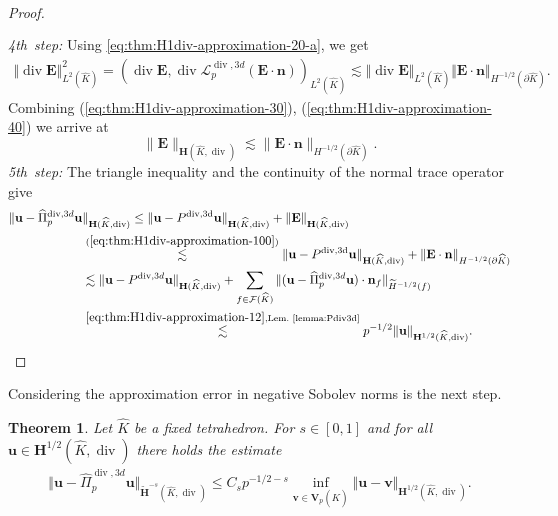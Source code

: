 \documentclass{article}
\newtheorem{theorem}{Theorem}[section]
\newcommand{\hatPidivcom}{\widehat\Pi^{\operatorname*{div},3d}_{p}}
\begin{document}
\begin{proof}
\begin{align}
\begin{split}
\end{split}
\end{align}
\emph{4th~step:} 
Using \eqref{eq:thm:H1div-approximation-20-a}, we get 
\begin{align}
\label{eq:thm:H1div-approximation-40}
\Vert\operatorname*{div}\mathbf{E}\Vert_{L^2(\widehat{K})}^2 = (\operatorname*{div}\mathbf{E},\operatorname*{div}\boldsymbol{\mathcal{L}}^{\operatorname*{div},3d}_p(\mathbf{E}\cdot\mathbf{n}))_{L^2(\widehat{K})} \lesssim \Vert\operatorname*{div}\mathbf{E}\Vert_{L^2(\widehat{K})} \Vert\mathbf{E}\cdot\mathbf{n}\Vert_{H^{-1/2}(\partial\widehat{K})}.
\end{align}
Combining 
(\ref{eq:thm:H1div-approximation-30}),
(\ref{eq:thm:H1div-approximation-40}) 
we arrive at 
\begin{equation}
\label{eq:thm:H1div-approximation-100}
\|{\mathbf E}\|_{{\mathbf H}(\widehat K ,\operatorname{div})} 
\lesssim \|{\mathbf E} \cdot {\mathbf n}\|_{H^{-1/2}(\partial \widehat K)}. 
\end{equation}
\emph{5th~step:} The triangle inequality and the continuity of the normal trace operator give 
\begin{align*}
\Vert \mathbf{u}-\hatPidivcom\mathbf{u}&\Vert_{\mathbf{H}(\widehat{K},\operatorname*{div})} 
\leq \Vert\mathbf{u} - P^{\operatorname{div,3d}}{\mathbf u}\Vert_{\mathbf{H}(\widehat{K},\operatorname*{div})} 
+ \Vert\mathbf{E}\Vert_{\mathbf{H}(\widehat{K},\operatorname*{div})} \\
&\stackrel{(\ref{eq:thm:H1div-approximation-100})}{\lesssim} 
\Vert\mathbf{u} - P^{\operatorname{div,3d}}{\mathbf u}\Vert_{\mathbf{H}(\widehat{K},\operatorname*{div})} 
+ \Vert\mathbf{E}\cdot{\mathbf n}\Vert_{H^{-1/2}(\partial \widehat{K})} \\
&\lesssim \Vert\mathbf{u} - P^{\operatorname{div},3d} \mathbf{u} \Vert_{\mathbf{H}(\widehat{K},\operatorname*{div})} 
+ \sum_{f\in\mathcal{F}(\widehat{K})}\Vert(\mathbf{u}-\hatPidivcom\mathbf{u})\cdot\mathbf{n}_f\Vert_{\widetilde{H}^{-1/2}(f)} \\
&\overset{\eqref{eq:thm:H1div-approximation-12},\text{Lem.~\ref{lemma:Pdiv3d}}}{\lesssim} p^{-1/2}\Vert\mathbf{u}\Vert_{\mathbf{H}^{1/2}(\widehat{K},\operatorname*{div})}.
\qedhere
\end{align*}
\end{proof}

Considering the approximation error in negative Sobolev norms is the next step.

\begin{theorem}
\label{thm:duality-again-div}
Let $\widehat K$ be a fixed tetrahedron.
For $s \in [0,1]$ and for all $\mathbf{u}\in \mathbf{H}^{1/2}(\widehat{K},\operatorname{div})$ 
there holds the estimate
\begin{align*}
\Vert\mathbf{u}-\hatPidivcom\mathbf{u}\Vert_{\widetilde{\mathbf{H}}^{-s}(\widehat{K},\operatorname{div})} 
\leq C_s  p^{-1/2-s} \inf_{{\mathbf v} \in {\mathbf V}_p(\widehat K)} \Vert\mathbf{u} - \mathbf{v}\Vert_{\mathbf{H}^{1/2}(\widehat{K},\operatorname{div})}.
\end{align*}
\end{theorem}
\end{document}
